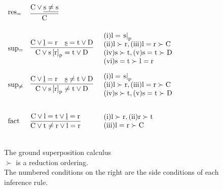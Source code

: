 \begin{figure}
$
\begin{array}[c]{llll}
\mathrm{res_{=}} &\vcenter{\infer[]{\m{C       }                               }{\m{C \lor \underline{s\neq s}}                   }} & 
\parbox[c][1.8cm]{5cm}{}
\\
\mathrm{sup_{=}} &\vcenter{\infer[]{\m{C \lor \termRepAt{s}{r}{p} =    t \lor D}}{\m{C \lor \underline{l}=r} & \m{\underline{s} =    t \lor D}}} & 
\parbox[c][1.8cm]{5cm}{
	\m{\sci{1}l = \termAt{s}{p}}\\
	\m{\sci{2}l \succ r,\sci{3}l=r \succ C}\\
	\m{\sci{4}s \succ t,\sci{5}s=t \succ D}\\
	\m{\sci{6}s=t \succ l=r}}\\
\mathrm{sup_{\neq}} &\vcenter{\infer[]{\m{C \lor \termRepAt{s}{r}{p} \neq t \lor D}}{\m{C \lor \underline{l}=r} & \m{\underline{s} \neq t \lor D}}} & 
\parbox[c][1.8cm]{5cm}{
	\m{\sci{1}l = \termAt{s}{p}}\\
	\m{\sci{2}l \succ r,\sci{3}l=r \succ C}\\
	\m{\sci{4}s \succ t,\sci{5}s=t \succ D}}\\
\mathrm{fact} & \vcenter{\infer[]{\m{C \lor t \neq r \lor l=r }                }{\m{C \lor l = t \lor \underline{l} = r}}} & 
\parbox[c][1.8cm]{5cm}{
	\m{\sci{1}l \succ r,\sci{2}r \succ t}\\
	\m{\sci{3}l=r \succ C}}\\
\end{array}
$
\caption{The ground superposition calculus \SPG\\
$\succ$ is a reduction ordering.\\
The numbered conditions on the right are the side conditions of each inference rule.\\
}
\end{figure}

